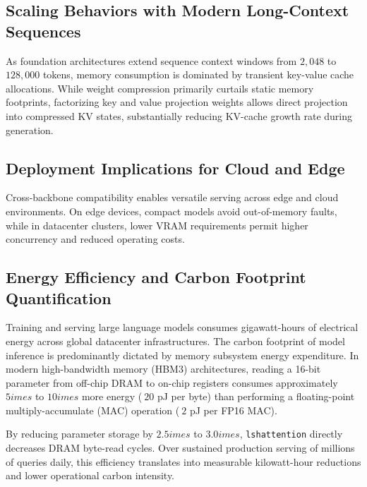 \subsection{Scaling Behaviors with Modern Long-Context Sequences}
As foundation architectures extend sequence context windows from $2{,}048$ to $128{,}000$ tokens, memory consumption is dominated by transient key-value cache allocations. While weight compression primarily curtails static memory footprints, factorizing key and value projection weights allows direct projection into compressed KV states, substantially reducing KV-cache growth rate during generation.

\subsection{Deployment Implications for Cloud and Edge}
Cross-backbone compatibility enables versatile serving across edge and cloud environments. On edge devices, compact models avoid out-of-memory faults, while in datacenter clusters, lower VRAM requirements permit higher concurrency and reduced operating costs.

\subsection{Energy Efficiency and Carbon Footprint Quantification}
Training and serving large language models consumes gigawatt-hours of electrical energy across global datacenter infrastructures. The carbon footprint of model inference is predominantly dictated by memory subsystem energy expenditure. In modern high-bandwidth memory (HBM3) architectures, reading a 16-bit parameter from off-chip DRAM to on-chip registers consumes approximately $5	imes$ to $10	imes$ more energy ($~20$ pJ per byte) than performing a floating-point multiply-accumulate (MAC) operation ($~2$ pJ per FP16 MAC).

By reducing parameter storage by $2.5	imes$ to $3.0	imes$, \texttt{lshattention} directly decreases DRAM byte-read cycles. Over sustained production serving of millions of queries daily, this efficiency translates into measurable kilowatt-hour reductions and lower operational carbon intensity.
